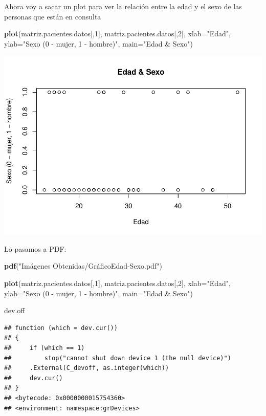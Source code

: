 \documentclass[]{article}
\newenvironment{Shaded}{\begin{snugshade}}{\end{snugshade}}
\newcommand{\KeywordTok}[1]{\textcolor[rgb]{0.13,0.29,0.53}{\textbf{#1}}}
\newcommand{\DataTypeTok}[1]{\textcolor[rgb]{0.13,0.29,0.53}{#1}}
\newcommand{\DecValTok}[1]{\textcolor[rgb]{0.00,0.00,0.81}{#1}}
\newcommand{\StringTok}[1]{\textcolor[rgb]{0.31,0.60,0.02}{#1}}
\newcommand{\NormalTok}[1]{#1}
\begin{document}
Ahora voy a sacar un plot para ver la relación entre la edad y el sexo
de las personas que están en consulta

\begin{Shaded}
\begin{Highlighting}[]
\KeywordTok{plot}\NormalTok{(matriz.pacientes.datos[,}\DecValTok{1}\NormalTok{], matriz.pacientes.datos[,}\DecValTok{2}\NormalTok{], }\DataTypeTok{xlab=}\StringTok{"Edad"}\NormalTok{, }\DataTypeTok{ylab=}\StringTok{"Sexo (0 - mujer, 1 - hombre)"}\NormalTok{, }\DataTypeTok{main=}\StringTok{"Edad & Sexo"}\NormalTok{)}
\end{Highlighting}
\end{Shaded}

\includegraphics{codigo_files/figure-latex/grafico_edad_sexo-1.pdf}

Lo pasamos a PDF:

\begin{Shaded}
\begin{Highlighting}[]
\KeywordTok{pdf}\NormalTok{(}\StringTok{"Imágenes Obtenidas/GráficoEdad-Sexo.pdf"}\NormalTok{)}

\KeywordTok{plot}\NormalTok{(matriz.pacientes.datos[,}\DecValTok{1}\NormalTok{], matriz.pacientes.datos[,}\DecValTok{2}\NormalTok{], }\DataTypeTok{xlab=}\StringTok{"Edad"}\NormalTok{, }\DataTypeTok{ylab=}\StringTok{"Sexo (0 - mujer, 1 - hombre)"}\NormalTok{, }\DataTypeTok{main=}\StringTok{"Edad & Sexo"}\NormalTok{)}

\NormalTok{dev.off}
\end{Highlighting}
\end{Shaded}

\begin{verbatim}
## function (which = dev.cur()) 
## {
##     if (which == 1) 
##         stop("cannot shut down device 1 (the null device)")
##     .External(C_devoff, as.integer(which))
##     dev.cur()
## }
## <bytecode: 0x0000000015754360>
## <environment: namespace:grDevices>
\end{verbatim}
\end{document}
